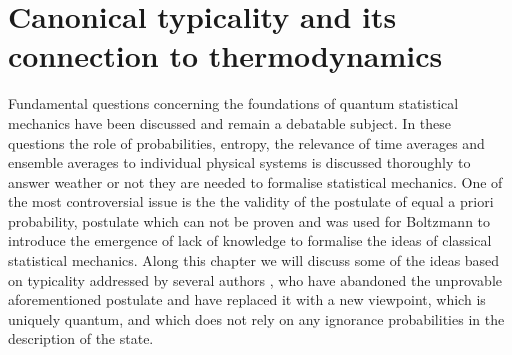 \chapter{Canonical typicality and its connection to thermodynamics}
Fundamental questions concerning the foundations of quantum statistical mechanics have been discussed and remain a debatable subject\cite{singh_foundations_2013}. In these questions the role of probabilities, entropy, the relevance of time averages and ensemble averages to individual physical systems is discussed thoroughly \cite{gemmer_quantum_2004} to answer weather or not they are needed to formalise statistical mechanics. One of the most controversial issue is the  the validity of the postulate of equal a priori probability, postulate which can not be proven\cite{singh_foundations_2013} and was used for Boltzmann \cite{boltzmann_uber_1866} to introduce the emergence of lack of knowledge to formalise the ideas of classical statistical mechanics. Along this chapter we will discuss some of the ideas based on typicality addressed by several authors \cite{gemmer_quantum_2004, goldstein_canonical_2006, popescu_entanglement_2006}, who have abandoned the unprovable aforementioned postulate and have replaced it with a new viewpoint, which is uniquely quantum, and which does not rely on any ignorance probabilities in the description of the state.\\




